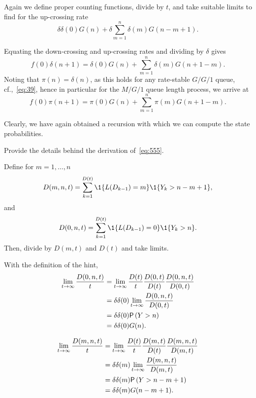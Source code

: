 \documentclass[companion]{subfiles}
\begin{document}
Again we define proper counting functions, divide by $t$, and take suitable limits to find for the up-crossing rate
\begin{equation}\label{eq:555}
\delta \delta(0) G(n) + \delta \sum_{m=1}^n \delta(m) G(n-m+1).
\end{equation}


Equating the down-crossing and up-crossing rates and dividing
by $\delta$ gives
\begin{equation*}
 f(0) \delta(n+1) = \delta(0) G(n) + \sum_{m=1}^{n} \delta(m) G(n+1-m).
\end{equation*}
Noting that $\pi(n) = \delta(n)$, as this holds for any rate-stable $G/G/1$ queue, cf.,~\cref{eq:39}, hence in particular for the $M/G/1$ queue length process, we arrive at
\begin{equation}\label{eq:72}
 f(0) \pi(n+1) = \pi(0) G(n) + \sum_{m=1}^{n} \pi(m) G(n+1-m).
\end{equation}

Clearly, we have again obtained a recursion with which we can compute the state probabilities. 


\begin{exercise}
 Provide the details behind the derivation of~\cref{eq:555}.
\begin{hint}
Define for $m=1,\ldots, n$
\begin{equation*}
 D(m, n, t) = \sum_{k=1}^{D(t)}\1{L(D_{k-1})=m}\1{Y_k>n-m+1},
\end{equation*}
and 
\begin{equation*}
 D(0, n, t) = \sum_{k=1}^{D(t)}\1{L(D_{k-1})=0}\1{Y_k>n}.
\end{equation*}
Then, divide by $D(m,t)$ and $D(t)$ and take limits.
\end{hint}
\begin{solution}
With the definition of the hint, 
\begin{align*}
 \lim_{t\to\infty} \frac{ D(0, n, t)}t 
&= \lim_{t\to\infty} \frac{D(t)}t \frac{D(0, t)}{D(t)}\frac{ D(0, n, t)}{D(0,t)} \\
&= \delta \delta(0) \lim_{t\to\infty} \frac{ D(0, n, t)}{D(0,t)} \\
&= \delta \delta(0) \P{Y>n}\\
& = \delta \delta(0) G(n).
\end{align*}

\begin{align*}
 \lim_{t\to\infty} \frac{ D(m, n, t)}t 
&= \lim_{t\to\infty} \frac{D(t)}t \frac{D(m, t)}{D(t)}\frac{ D(m, n, t)}{D(m,t)} \\
&= \delta \delta(m) \lim_{t\to\infty} \frac{ D(m, n, t)}{D(m,t)} \\
&= \delta \delta(m) \P{Y>n-m+1}\\
& = \delta \delta(m) G(n-m+1).
\end{align*}
\end{solution}
\end{exercise}
\end{document}
